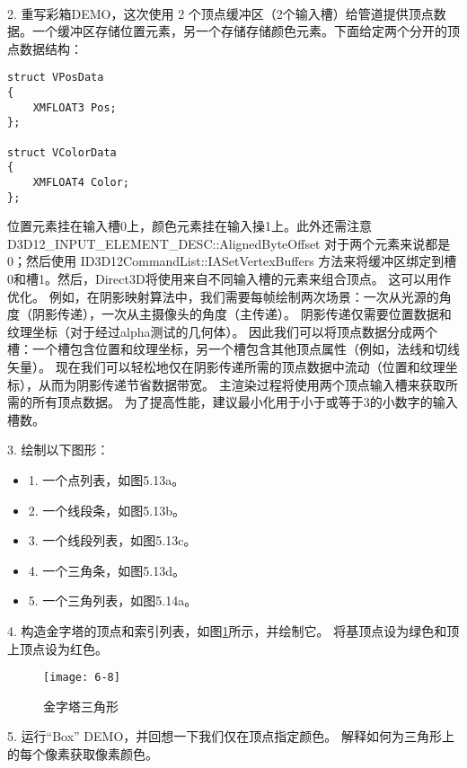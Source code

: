 \begin{flushleft}
~\\
2. 重写彩箱DEMO，这次使用 2 个顶点缓冲区（2个输入槽）给管道提供顶点数据。一个缓冲区存储位置元素，另一个存储存储颜色元素。下面给定两个分开的顶点数据结构：\\
\end{flushleft}
\begin{lstlisting}
struct VPosData
{
    XMFLOAT3 Pos;
};

struct VColorData
{
    XMFLOAT4 Color;
};
\end{lstlisting}
\begin{flushleft}
位置元素挂在输入槽0上，颜色元素挂在输入操1上。此外还需注意 D3D12\_INPUT\_ELEMENT\_DESC::AlignedByteOffset 对于两个元素来说都是0；然后使用 ID3D12CommandList::IASetVertexBuffers 方法来将缓冲区绑定到槽0和槽1。然后，Direct3D将使用来自不同输入槽的元素来组合顶点。 这可以用作优化。 例如，在阴影映射算法中，我们需要每帧绘制两次场景：一次从光源的角度（阴影传递），一次从主摄像头的角度（主传递）。 阴影传递仅需要位置数据和纹理坐标（对于经过alpha测试的几何体）。 因此我们可以将顶点数据分成两个槽：一个槽包含位置和纹理坐标，另一个槽包含其他顶点属性（例如，法线和切线矢量）。 现在我们可以轻松地仅在阴影传递所需的顶点数据中流动（位置和纹理坐标），从而为阴影传递节省数据带宽。 主渲染过程将使用两个顶点输入槽来获取所需的所有顶点数据。 为了提高性能，建议最小化用于小于或等于3的小数字的输入槽数。\\
\end{flushleft}

\begin{flushleft}
3. 绘制以下图形：\\
\begin{itemize}
  \item 1. 一个点列表，如图5.13a。
  \item 2. 一个线段条，如图5.13b。
  \item 3. 一个线段列表，如图5.13c。
  \item 4. 一个三角条，如图5.13d。
  \item 5. 一个三角列表，如图5.14a。
\end{itemize}
\end{flushleft}

\begin{flushleft}
4. 构造金字塔的顶点和索引列表，如图\ref{fig:6-8}所示，并绘制它。 将基顶点设为绿色和顶上顶点设为红色。\\
\end{flushleft}
\begin{figure}[h]
    \texttt{[image: 6-8]}
    \centering
    \caption{金字塔三角形}
    \label{fig:6-8}
\end{figure}
\begin{flushleft}
5. 运行“Box” DEMO，并回想一下我们仅在顶点指定颜色。 解释如何为三角形上的每个像素获取像素颜色。
\end{flushleft}


